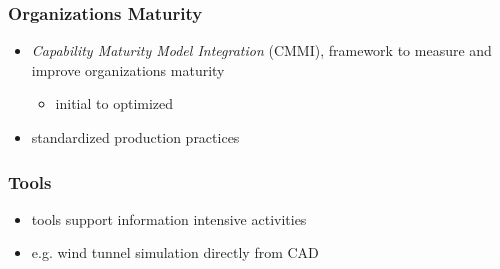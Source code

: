 \documentclass[a4paper, 10pt]{article}
\begin{document}
\subsubsection*{Organizations Maturity}
\begin{itemize}
    \item \emph{Capability Maturity Model Integration} (CMMI), framework to measure and improve organizations maturity
    \begin{itemize}
        \item initial to optimized
    \end{itemize}
    \item standardized production practices
\end{itemize}

\subsubsection*{Tools}
\begin{itemize}
    \item tools support information intensive activities
    \item e.g. wind tunnel simulation directly from CAD
\end{itemize}
\end{document}
